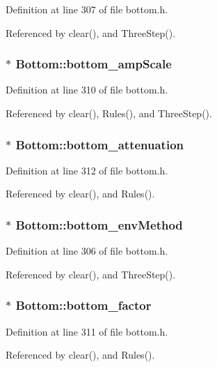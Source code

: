 Definition at line 307 of file bottom.h.

Referenced by clear(), and Three\-Step().
\subsubsection{$\ast$ {\bf Bottom::bottom\_\-amp\-Scale}}\label{classBottom_o12}




Definition at line 310 of file bottom.h.

Referenced by clear(), Rules(), and Three\-Step().
\subsubsection{$\ast$ {\bf Bottom::bottom\_\-attenuation}}\label{classBottom_o14}




Definition at line 312 of file bottom.h.

Referenced by clear(), and Rules().
\subsubsection{$\ast$ {\bf Bottom::bottom\_\-env\-Method}}\label{classBottom_o8}




Definition at line 306 of file bottom.h.

Referenced by clear(), and Three\-Step().
\subsubsection{$\ast$ {\bf Bottom::bottom\_\-factor}}\label{classBottom_o13}




Definition at line 311 of file bottom.h.

Referenced by clear(), and Rules().
